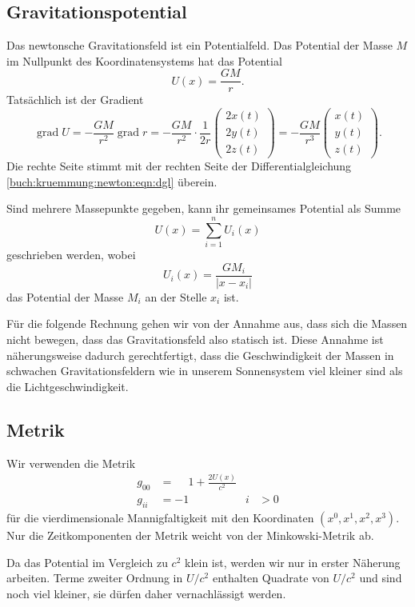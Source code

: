 %
%
\subsection{Gravitationspotential}
Das newtonsche Gravitationsfeld ist ein Potentialfeld.
Das Potential der Masse $M$ im Nullpunkt des Koordinatensystems
hat das Potential
\[
U(x) = \frac{GM}{r}.
\]
Tatsächlich ist der Gradient 
\[
\operatorname{grad}U
=
-\frac{GM}{r^2} \operatorname{grad}{r}
=
-\frac{GM}{r^2}
\cdot
\frac{1}{2r}
\begin{pmatrix}
2x(t)\\
2y(t)\\
2z(t)
\end{pmatrix}
=
-\frac{GM}{r^3}
\begin{pmatrix}
x(t)\\
y(t)\\
z(t)
\end{pmatrix}
.
\]
Die rechte Seite stimmt mit der rechten Seite der Differentialgleichung
\eqref{buch:kruemmung:newton:eqn:dgl}
überein.

Sind mehrere Massepunkte gegeben, kann ihr gemeinsames Potential 
als Summe
\[
U(x)
=
\sum_{i=1}^n U_i(x)
\]
geschrieben werden, wobei
\[
U_i(x)
=
\frac{GM_i}{|x-x_i|}
\]
das Potential der Masse $M_i$ an der Stelle $x_i$ ist.

Für die folgende Rechnung gehen wir von der Annahme aus, dass sich die
Massen nicht bewegen, dass das Gravitationsfeld also statisch ist.
Diese Annahme ist näherungsweise dadurch gerechtfertigt, dass die
Geschwindigkeit der Massen in schwachen Gravitationsfeldern wie in
unserem Sonnensystem viel kleiner sind als die Lichtgeschwindigkeit.

%
%
\subsection{Metrik}
Wir verwenden die Metrik
\begin{equation}
\begin{aligned}
g_{00} &= \phantom{-}1 + \frac{2U(x)}{c^2} \\
g_{ii} &= -1\qquad &i&>0
\end{aligned}
\label{buch:kruemmung:newton:eqn:metrik}
\end{equation}
für die vierdimensionale Mannigfaltigkeit mit den Koordinaten
$(x^0,x^1,x^2,x^3)$.
Nur die Zeitkomponenten der Metrik weicht von der Minkowski-Metrik ab.

Da das Potential im Vergleich zu $c^2$ klein ist, werden wir nur in
erster Näherung arbeiten.
Terme zweiter Ordnung in $U/c^2$ enthalten Quadrate von $U/c^2$ und sind
noch viel kleiner, sie dürfen daher vernachlässigt werden.

